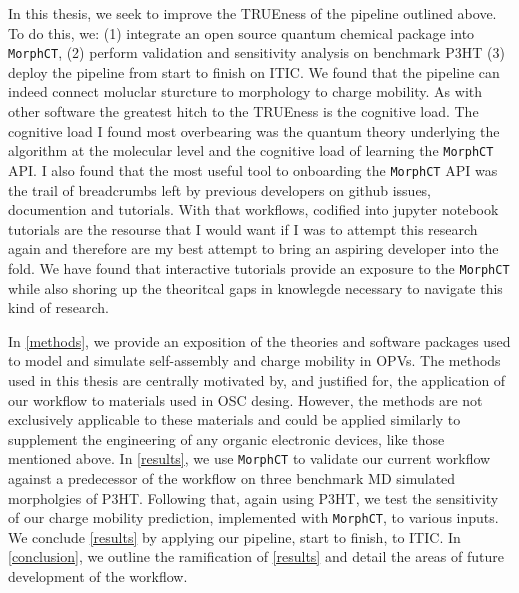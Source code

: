 In this thesis, we seek to improve the TRUEness of the pipeline outlined above.
To do this, we: (1) integrate an open source quantum chemical package into \texttt{MorphCT},
(2) perform validation and sensitivity analysis on benchmark P3HT
(3) deploy the pipeline from start to finish on ITIC. 
We found that the pipeline can indeed connect moluclar sturcture to morphology to charge
mobility. As with other software the greatest hitch to the TRUEness is the
cognitive load. The cognitive load I found most overbearing was the quantum theory underlying the algorithm 
at the molecular level and the cognitive load of learning the \texttt{MorphCT} API. 
I also found that the most useful tool to onboarding the \texttt{MorphCT} API was the
trail of breadcrumbs left by previous developers on github issues, documention and tutorials. 
With that workflows, codified into jupyter notebook tutorials are the resourse that I would want if I was to
attempt this research again and therefore are my best attempt to bring an aspiring developer into the fold.
We have found that interactive tutorials provide an exposure to the \texttt{MorphCT} while also shoring up the
theoritcal gaps in knowlegde necessary to navigate this kind of research. 

In \autoref{methods}, we
provide an exposition of the theories and software packages used to model and simulate self-assembly and charge mobility in
OPVs.
The methods used in this thesis are centrally motivated by, and justified for, 
the application of our workflow to materials
used in OSC desing. However, the methods are
not exclusively applicable to these materials and could be applied similarly to supplement the engineering of any organic
electronic devices, like those mentioned above. 
In \autoref{results}, we use \texttt{MorphCT} to validate our current workflow against a predecessor of the 
workflow on three benchmark MD simulated morpholgies of P3HT. 
Following that, again using P3HT, we test the sensitivity of our charge mobility prediction, 
implemented with \texttt{MorphCT}, to various inputs. We conclude \autoref{results} by applying our pipeline,
start to finish, to ITIC. 
In \autoref{conclusion}, we outline the ramification of \autoref{results} and detail the areas of future development of the workflow. 

